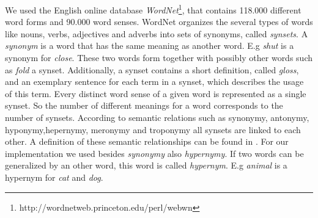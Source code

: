 We used the English online database \textit{WordNet}\footnote{http://wordnetweb.princeton.edu/perl/webwn}, that contains 118.000 different word forms and 90.000 word senses. WordNet organizes the several types of words like nouns, verbs, adjectives and adverbs into sets of synonyms, called \textit{synsets}. A \textit{synonym} is a word that has the same meaning as another word. E.g \textit{shut} is a synonym for \textit{close}. These two words form together with possibly other words such as \textit{fold} a synset.
Additionally, a synset contains a short definition, called \textit{gloss}, and an exemplary sentence for each term in a synset, which describes the usage of this term. Every distinct word sense of a given word is represented as a single synset. So the number of different meanings for a word corresponds to the number of synsets. According to semantic relations such as synonymy, antonymy, hyponymy,hepernymy, meronymy and troponymy all synsets are linked to each other. A definition of these semantic relationships can be found in \cite{Miller1995}. For our implementation we used besides \textit{synonymy} also \textit{hypernymy}. If two words can be generalized by an other word, this word is called \textit{hypernym}. E.g \textit{animal} is a hypernym for \textit{cat} and \textit{dog}.

